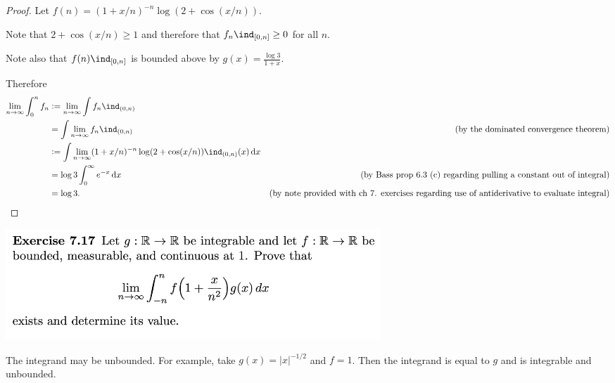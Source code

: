 \begin{proof}
  Let $f(n) = (1 + x/n)^{-n} \log(2 + \cos(x/n))$.

  Note that $2 + \cos(x/n) \geq 1$ and therefore that $f_n\ind_{[0, n]} \geq 0$ for all $n$.

  Note also that $f(n)\ind_{[0, n]}$ is bounded above by $g(x) = \frac{\log 3}{1 + x}$.

  Therefore
  \begin{align*}
    \limn \int_0^n f_n
    &:=\limn \int f_n\ind_{(0, n)}                                        &\\
    &= \int \limn f_n\ind_{(0, n)}                                        &\text{(by the dominated convergence theorem)}\\
    &:= \int \limn (1 + x/n)^{-n} \log(2 + \cos(x/n))\ind_{(0, n)}(x)\dx  & \\
    &= \log 3\int_0^\infty e^{-x} \dx                                     &\text{(by Bass prop 6.3 (c) regarding pulling a constant out of integral})\\
    &= \log 3.                                                           &\text{(by note provided with ch 7. exercises regarding use of antiderivative to evaluate integral)}
  \end{align*}

\end{proof}

\begin{mdframed}
\includegraphics[width=400pt]{img/analysis--berkeley-202a-hw08-6e60.png}
\end{mdframed}

\begin{remark*}
  The integrand may be unbounded. For example, take $g(x) = |x|^{-1/2}$ and $f = 1$. Then the integrand is
  equal to $g$ and is integrable and unbounded.
\end{remark*}

